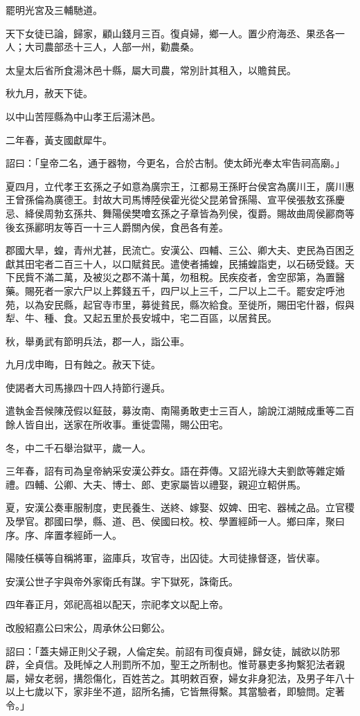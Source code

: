 \begin{pinyinscope}
罷明光宮及三輔馳道。

天下女徒已論，歸家，顧山錢月三百。復貞婦，鄉一人。置少府海丞、果丞各一人；大司農部丞十三人，人部一州，勸農桑。

太皇太后省所食湯沐邑十縣，屬大司農，常別計其租入，以贍貧民。

秋九月，赦天下徒。

以中山苦陘縣為中山孝王后湯沐邑。

二年春，黃支國獻犀牛。

詔曰：「皇帝二名，通于器物，今更名，合於古制。使太師光奉太牢告祠高廟。」

夏四月，立代孝王玄孫之子如意為廣宗王，江都易王孫盱台侯宮為廣川王，廣川惠王曾孫倫為廣德王。封故大司馬博陸侯霍光從父昆弟曾孫陽、宣平侯張敖玄孫慶忌、絳侯周勃玄孫共、舞陽侯樊噲玄孫之子章皆為列侯，復爵。賜故曲周侯酈商等後玄孫酈明友等百一十三人爵關內侯，食邑各有差。

郡國大旱，蝗，青州尤甚，民流亡。安漢公、四輔、三公、卿大夫、吏民為百困乏獻其田宅者二百三十人，以口賦貧民。遣使者捕蝗，民捕蝗詣吏，以石砀受錢。天下民貲不滿二萬，及被災之郡不滿十萬，勿租稅。民疾疫者，舍空邸第，為置醫藥。賜死者一家六尸以上葬錢五千，四尸以上三千，二尸以上二千。罷安定呼池苑，以為安民縣，起官寺巿里，募徙貧民，縣次給食。至徙所，賜田宅什器，假與犁、牛、種、食。又起五里於長安城中，宅二百區，以居貧民。

秋，舉勇武有節明兵法，郡一人，詣公車。

九月戊申晦，日有蝕之。赦天下徒。

使謁者大司馬掾四十四人持節行邊兵。

遣執金吾候陳茂假以鉦鼓，募汝南、南陽勇敢吏士三百人，諭說江湖賊成重等二百餘人皆自出，送家在所收事。重徙雲陽，賜公田宅。

冬，中二千石舉治獄平，歲一人。

三年春，詔有司為皇帝納采安漢公莽女。語在莽傳。又詔光祿大夫劉歆等雜定婚禮。四輔、公卿、大夫、博士、郎、吏家屬皆以禮娶，親迎立軺併馬。

夏，安漢公奏車服制度，吏民養生、送終、嫁娶、奴婢、田宅、器械之品。立官稷及學官。郡國曰學，縣、道、邑、侯國曰校。校、學置經師一人。鄉曰庠，聚曰序。序、庠置孝經師一人。

陽陵任橫等自稱將軍，盜庫兵，攻官寺，出囚徒。大司徒掾督逐，皆伏辜。

安漢公世子宇與帝外家衛氏有謀。宇下獄死，誅衛氏。

四年春正月，郊祀高祖以配天，宗祀孝文以配上帝。

改殷紹嘉公曰宋公，周承休公曰鄭公。

詔曰：「蓋夫婦正則父子親，人倫定矣。前詔有司復貞婦，歸女徒，誠欲以防邪辟，全貞信。及眊悼之人刑罰所不加，聖王之所制也。惟苛暴吏多拘繫犯法者親屬，婦女老弱，搆怨傷化，百姓苦之。其明敕百寮，婦女非身犯法，及男子年八十以上七歲以下，家非坐不道，詔所名捕，它皆無得繫。其當驗者，即驗問。定著令。」


\end{pinyinscope}

